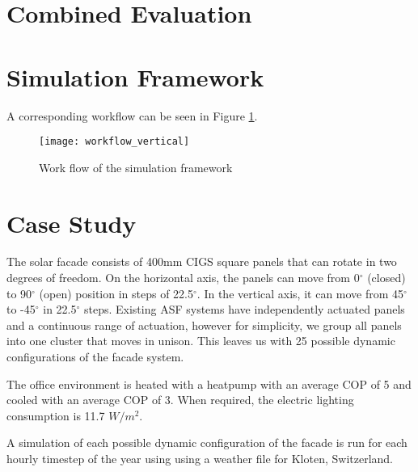 	\section{Combined Evaluation}

	\section{Simulation Framework}
		A corresponding workflow can be seen in Figure \ref{fig:workflow}. 

		\begin{figure}[ht] %
		\begin{center}
			\texttt{[image: workflow\_vertical]}
			\caption{Work flow of the simulation framework}
			\label{fig:workflow}
		\end{center} 
		\end{figure}

	\section{Case Study}
		The solar facade consists of 400mm CIGS square panels that can rotate in two degrees of freedom. On the horizontal axis, the panels can move from 0$^{\circ}$ (closed) to 90$^{\circ}$ (open) position in steps of 22.5$^{\circ}$. In the vertical axis, it can move from 45$^{\circ}$ to -45$^{\circ}$ in 22.5$^{\circ}$ steps. Existing ASF systems \cite{nagy2015frontiers} have independently actuated panels and a continuous range of actuation, however for simplicity, we group all panels into one cluster that moves in unison. This leaves us with 25 possible dynamic configurations of the facade system. 

		The office environment is heated with a heatpump with an average COP of 5 and cooled with an average COP of 3. When required, the electric lighting consumption is 11.7 $W/m^2$. 

		A simulation of each possible dynamic configuration of the facade is run for each hourly timestep of the year using using a weather file for Kloten, Switzerland. %



